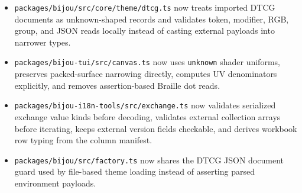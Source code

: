 \begin{itemize}
\tightlist
\item
  \texttt{p\allowbreak{}a\allowbreak{}c\allowbreak{}k\allowbreak{}a\allowbreak{}g\allowbreak{}e\allowbreak{}s\allowbreak{}/\allowbreak{}b\allowbreak{}i\allowbreak{}j\allowbreak{}o\allowbreak{}u\allowbreak{}/\allowbreak{}s\allowbreak{}r\allowbreak{}c\allowbreak{}/\allowbreak{}c\allowbreak{}o\allowbreak{}r\allowbreak{}e\allowbreak{}/\allowbreak{}t\allowbreak{}h\allowbreak{}e\allowbreak{}m\allowbreak{}e\allowbreak{}/\allowbreak{}d\allowbreak{}t\allowbreak{}c\allowbreak{}g\allowbreak{}.\allowbreak{}t\allowbreak{}s} now treats imported DTCG documents as unknown-shaped records and validates token, modifier, RGB, group, and JSON reads locally instead of casting external payloads into narrower types.
\item
  \texttt{p\allowbreak{}a\allowbreak{}c\allowbreak{}k\allowbreak{}a\allowbreak{}g\allowbreak{}e\allowbreak{}s\allowbreak{}/\allowbreak{}b\allowbreak{}i\allowbreak{}j\allowbreak{}o\allowbreak{}u\allowbreak{}-\allowbreak{}t\allowbreak{}u\allowbreak{}i\allowbreak{}/\allowbreak{}s\allowbreak{}r\allowbreak{}c\allowbreak{}/\allowbreak{}c\allowbreak{}a\allowbreak{}n\allowbreak{}v\allowbreak{}a\allowbreak{}s\allowbreak{}.\allowbreak{}t\allowbreak{}s} now uses \texttt{u\allowbreak{}n\allowbreak{}k\allowbreak{}n\allowbreak{}o\allowbreak{}w\allowbreak{}n} shader uniforms, preserves packed-surface narrowing directly, computes UV denominators explicitly, and removes assertion-based Braille dot reads.
\item
  \texttt{p\allowbreak{}a\allowbreak{}c\allowbreak{}k\allowbreak{}a\allowbreak{}g\allowbreak{}e\allowbreak{}s\allowbreak{}/\allowbreak{}b\allowbreak{}i\allowbreak{}j\allowbreak{}o\allowbreak{}u\allowbreak{}-\allowbreak{}i\allowbreak{}1\allowbreak{}8\allowbreak{}n\allowbreak{}-\allowbreak{}t\allowbreak{}o\allowbreak{}o\allowbreak{}l\allowbreak{}s\allowbreak{}/\allowbreak{}s\allowbreak{}r\allowbreak{}c\allowbreak{}/\allowbreak{}e\allowbreak{}x\allowbreak{}c\allowbreak{}h\allowbreak{}a\allowbreak{}n\allowbreak{}g\allowbreak{}e\allowbreak{}.\allowbreak{}t\allowbreak{}s} now validates serialized exchange value kinds before decoding, validates external collection arrays before iterating, keeps external version fields checkable, and derives workbook row typing from the column manifest.
\item
  \texttt{p\allowbreak{}a\allowbreak{}c\allowbreak{}k\allowbreak{}a\allowbreak{}g\allowbreak{}e\allowbreak{}s\allowbreak{}/\allowbreak{}b\allowbreak{}i\allowbreak{}j\allowbreak{}o\allowbreak{}u\allowbreak{}/\allowbreak{}s\allowbreak{}r\allowbreak{}c\allowbreak{}/\allowbreak{}f\allowbreak{}a\allowbreak{}c\allowbreak{}t\allowbreak{}o\allowbreak{}r\allowbreak{}y\allowbreak{}.\allowbreak{}t\allowbreak{}s} now shares the DTCG JSON document guard used by file-based theme loading instead of asserting parsed environment payloads.

\end{itemize}
